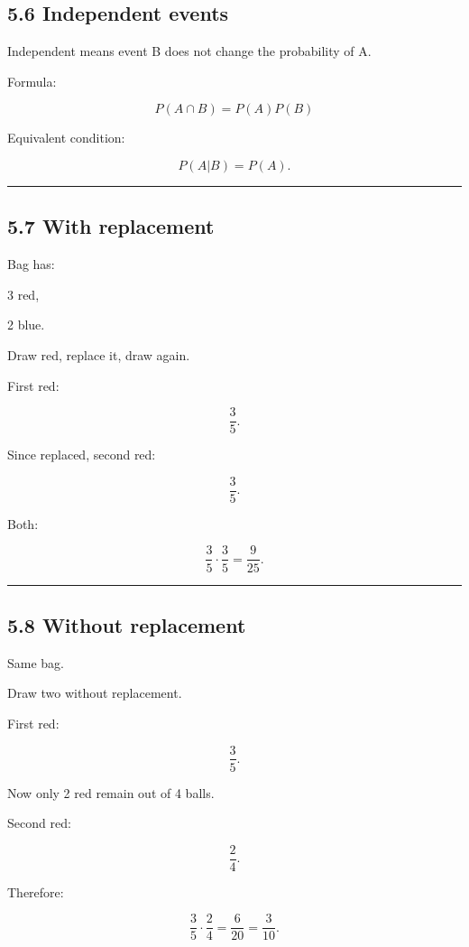 \documentclass[
]{article}
\begin{document}
\subsection{5.6 Independent events}\label{independent-events}

Independent means event B does not change the probability of A.

Formula:

\[
\boxed{
P(A\cap B)
=
P(A)P(B)
}
\]

Equivalent condition:

\[
\boxed{P(A|B)=P(A)}.
\]

\begin{center}\rule{0.5\linewidth}{0.5pt}\end{center}

\subsection{5.7 With replacement}\label{with-replacement}

Bag has:

3 red,

2 blue.

Draw red, replace it, draw again.

First red:

\[
\frac35.
\]

Since replaced, second red:

\[
\frac35.
\]

Both:

\[
\frac35\cdot\frac35
=
\boxed{\frac9{25}}.
\]

\begin{center}\rule{0.5\linewidth}{0.5pt}\end{center}

\subsection{5.8 Without replacement}\label{without-replacement}

Same bag.

Draw two without replacement.

First red:

\[
\frac35.
\]

Now only 2 red remain out of 4 balls.

Second red:

\[
\frac24.
\]

Therefore:

\[
\frac35\cdot\frac24
=
\frac6{20}
=
\boxed{\frac3{10}}.
\]
\end{document}
